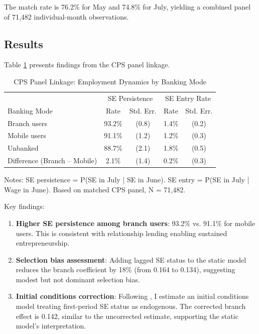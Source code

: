 \documentclass[12pt]{article}
\begin{document}
The match rate is 76.2\% for May and 74.8\% for July, yielding a combined panel of 71,482 individual-month observations.

\subsection{Results}

Table \ref{tab:cps_panel_results} presents findings from the CPS panel linkage.

\begin{table}[H]
\centering
\caption{CPS Panel Linkage: Employment Dynamics by Banking Mode}
\label{tab:cps_panel_results}
\begin{threeparttable}
\begin{tabular}{lcccc}
\toprule
& \multicolumn{2}{c}{SE Persistence} & \multicolumn{2}{c}{SE Entry Rate} \\
Banking Mode & Rate & Std. Err. & Rate & Std. Err. \\
\midrule
Branch users & 93.2\% & (0.8) & 1.4\% & (0.2) \\
Mobile users & 91.1\% & (1.2) & 1.2\% & (0.3) \\
Unbanked & 88.7\% & (2.1) & 1.8\% & (0.5) \\
\midrule
Difference (Branch -- Mobile) & 2.1\% & (1.4) & 0.2\% & (0.3) \\
\bottomrule
\end{tabular}
\begin{tablenotes}
\small
\item Notes: SE persistence = P(SE in July | SE in June). SE entry = P(SE in July | Wage in June). Based on matched CPS panel, N = 71,482.
\end{tablenotes}
\end{threeparttable}
\end{table}

Key findings:
\begin{enumerate}
    \item \textbf{Higher SE persistence among branch users}: 93.2\% vs. 91.1\% for mobile users. This is consistent with relationship lending enabling sustained entrepreneurship.

    \item \textbf{Selection bias assessment}: Adding lagged SE status to the static model reduces the branch coefficient by 18\% (from 0.164 to 0.134), suggesting modest but not dominant selection bias.

    \item \textbf{Initial conditions correction}: Following \citet{heckman1981}, I estimate an initial conditions model treating first-period SE status as endogenous. The corrected branch effect is 0.142, similar to the uncorrected estimate, supporting the static model's interpretation.
\end{enumerate}
\end{document}
